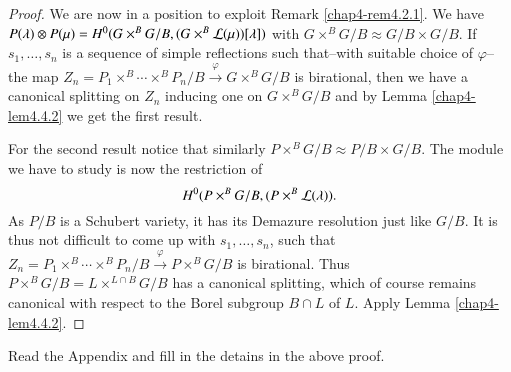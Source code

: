 \begin{proof}
We are now in a position to exploit Remark \ref{chap4-rem4.2.1}. We
have $P(\lambda)\otimes
P(\mu)=H^{0}(G\times^{B}G/B,(G\times^{B}\mathcal{L}(\mu))[\lambda])$ with
$G\times^{B}G/B\approx G/B\times G/B$. If $s_{1},\ldots,s_{n}$ is a
sequence of simple reflections such that--with suitable choice of
$\varphi$--the map
$Z_{n}=P_{1}\times^{B}\cdots\times^{B}P_{n}/B\xrightarrow{\varphi}G\times^{B}G/B$
is birational, then we have a canonical splitting on $Z_{n}$ inducing
one on $G\times^{B}G/B$ and by Lemma \ref{chap4-lem4.4.2} we get the
first result.

For the second result notice that similarly $P\times^{B}G/B\approx
P/B\times G/B$. The module we have to study is now the restriction of
$$
H^{0}(P\times^{B}G/B,(P\times^{B}\mathcal{L}(\lambda)).
$$ 
As $P/B$ is a
Schubert variety, it has its Demazure resolution just like $G/B$. It
is thus not difficult to come up with $s_{1},\ldots,s_{n}$, such that
$Z_{n}=P_{1}\times^{B}\cdots\times^{B}P_{n}/B\xrightarrow{\varphi}P\times^{B}G/B$
is birational. Thus $P\times^{B}G/B=L\times^{L\cap B}G/B$ has a
canonical splitting, which of course remains canonical with respect to
the Borel subgroup $B\cap L$ of $L$. Apply Lemma \ref{chap4-lem4.4.2}.
\end{proof}

\begin{exercise}\label{chap4-exer4.4.4}
Read the Appendix and fill in the detains in the above proof. 
\end{exercise}




